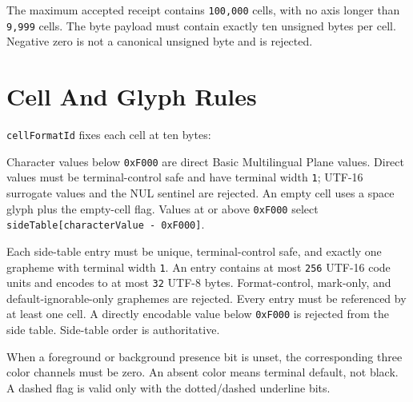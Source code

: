 The maximum accepted receipt contains \texttt{1\allowbreak{}0\allowbreak{}0\allowbreak{},\allowbreak{}0\allowbreak{}0\allowbreak{}0} cells, with no axis longer than \texttt{9\allowbreak{},\allowbreak{}9\allowbreak{}9\allowbreak{}9} cells. The byte payload must contain exactly ten unsigned bytes per cell. Negative zero is not a canonical unsigned byte and is rejected.

\section{Cell And Glyph Rules}\label{record-022-cell-and-glyph-rules}

\texttt{c\allowbreak{}e\allowbreak{}l\allowbreak{}l\allowbreak{}F\allowbreak{}o\allowbreak{}r\allowbreak{}m\allowbreak{}a\allowbreak{}t\allowbreak{}I\allowbreak{}d} fixes each cell at ten bytes:



Character values below \texttt{0\allowbreak{}x\allowbreak{}F\allowbreak{}0\allowbreak{}0\allowbreak{}0} are direct Basic Multilingual Plane values. Direct values must be terminal-control safe and have terminal width \texttt{1}; UTF-16 surrogate values and the NUL sentinel are rejected. An empty cell uses a space glyph plus the empty-cell flag. Values at or above \texttt{0\allowbreak{}x\allowbreak{}F\allowbreak{}0\allowbreak{}0\allowbreak{}0} select \texttt{s\allowbreak{}i\allowbreak{}d\allowbreak{}e\allowbreak{}T\allowbreak{}a\allowbreak{}b\allowbreak{}l\allowbreak{}e\allowbreak{}[\allowbreak{}c\allowbreak{}h\allowbreak{}a\allowbreak{}r\allowbreak{}a\allowbreak{}c\allowbreak{}t\allowbreak{}e\allowbreak{}r\allowbreak{}V\allowbreak{}a\allowbreak{}l\allowbreak{}u\allowbreak{}e\allowbreak{} \allowbreak{}-\allowbreak{} \allowbreak{}0\allowbreak{}x\allowbreak{}F\allowbreak{}0\allowbreak{}0\allowbreak{}0\allowbreak{}]}.

Each side-table entry must be unique, terminal-control safe, and exactly one grapheme with terminal width \texttt{1}. An entry contains at most \texttt{2\allowbreak{}5\allowbreak{}6} UTF-16 code units and encodes to at most \texttt{3\allowbreak{}2} UTF-8 bytes. Format-control, mark-only, and default-ignorable-only graphemes are rejected. Every entry must be referenced by at least one cell. A directly encodable value below \texttt{0\allowbreak{}x\allowbreak{}F\allowbreak{}0\allowbreak{}0\allowbreak{}0} is rejected from the side table. Side-table order is authoritative.

When a foreground or background presence bit is unset, the corresponding three color channels must be zero. An absent color means terminal default, not black. A dashed flag is valid only with the dotted/dashed underline bits.

